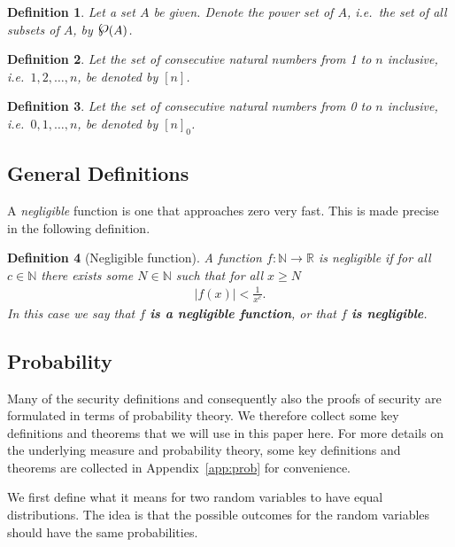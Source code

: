 \documentclass{article}
\newcommand\paper{paper}
\newcommand{\powerset}{\raisebox{.15\baselineskip}{\Large\ensuremath{\wp}}}
\newcommand{\seq}[1]{\left[#1\right]}
\newcommand{\seqZ}[1]{\left[#1\right]_0}
\newtheorem{definition}{Definition}
\theoremstyle{remark}
\newcommand{\N}{\mathbb{N}}
\begin{document}
\begin{definition}
	Let a set $A$ be given. Denote the \textit{power set} of $A$, i.e.\ the set
	of all subsets of $A$, by $\powerset(A)$.
\end{definition}

\begin{definition}
	Let the set of consecutive natural numbers from 1 to $n$ inclusive, i.e.\
	$1, 2, \ldots, n$, be denoted by $\seq{n}$.
\end{definition}

\begin{definition}
	Let the set of consecutive natural numbers from 0 to $n$ inclusive, i.e.\
	$0, 1, \ldots, n$, be denoted by $\seqZ{n}$.
\end{definition}

\subsection{General Definitions}

A \textit{negligible} function is one that approaches zero very fast. This is
made precise in the following definition.
\begin{definition}[Negligible function]
	A function $f: \N \to \mathbb{R}$ is negligible if for all $c \in \N$ there
	exists some $N \in \N$ such that for all $x \ge N$
	\begin{align*}
		|f(x)| < \frac{1}{x^c}.
	\end{align*}
	In this case we say that $f$ \textbf{is a negligible function}, or that $f$
	\textbf{is negligible}.
\end{definition}

\subsection{Probability}

Many of the security definitions and consequently also the proofs of security
are formulated in terms of probability theory. We therefore collect some key
definitions and theorems that we will use in this \paper{} here. For more
details on the underlying measure and probability theory, some key definitions
and theorems are collected in Appendix~\ref{app:prob} for convenience.

We first define what it means for two random variables to have equal
distributions. The idea is that the possible outcomes for the random variables
should have the same probabilities.
\end{document}
